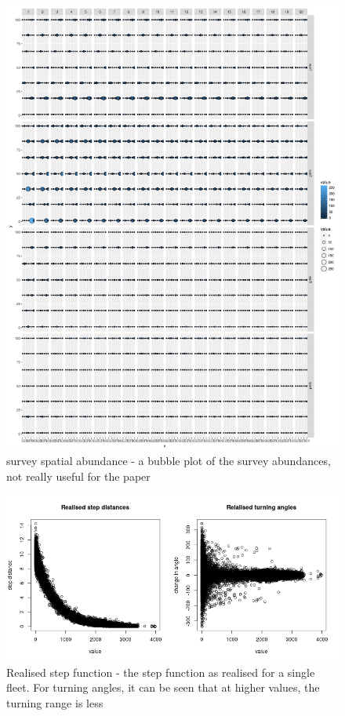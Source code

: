 \documentclass[review]{elsarticle}
\begin{document}
\begin{figure}[!ht]
	\includegraphics[width = \linewidth]{../tests/plots/spatial_survey}
	\caption{survey spatial abundance - a bubble plot of the survey
		abundances, not really useful for the paper}
	\label{fig:11}
\end{figure}	

\begin{figure}[!ht]
	\includegraphics[width = \linewidth]{../tests/plots/step_function}
	\caption{Realised step function - the step function as realised for a
		single fleet. For turning angles, it can be seen that at higher
	values, the turning range is less}
	\label{fig:12}
\end{figure}	
\end{document}
